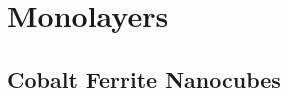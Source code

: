 \documentclass[\main/dresen_thesis.tex]{subfiles}
\begin{document}
\chapter{Monolayers}\label{ch:monolayers}
  

  \section{Cobalt Ferrite Nanocubes}
    


%   

\printbibliography
\end{document}
